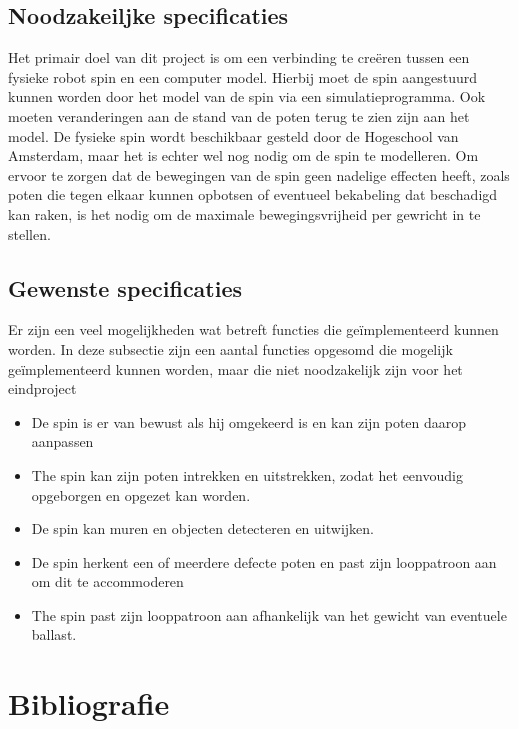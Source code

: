 \documentclass[10pt,a4paper]{article}
\begin{document}
\subsection{Noodzakeiljke specificaties}
Het primair doel van dit project is om een verbinding te creëren tussen een fysieke robot spin en een computer model. Hierbij moet de spin aangestuurd kunnen worden door het model van de spin via een simulatieprogramma. Ook moeten veranderingen aan de stand van de poten terug te zien zijn aan het model. De fysieke spin wordt beschikbaar gesteld door de Hogeschool van Amsterdam, maar het is echter wel nog nodig om de spin te modelleren.
Om ervoor te zorgen dat de bewegingen van de spin geen nadelige effecten heeft, zoals poten die tegen elkaar kunnen opbotsen of eventueel bekabeling dat beschadigd kan raken, is het nodig om de maximale bewegingsvrijheid per gewricht in te stellen.

\subsection{Gewenste specificaties}
Er zijn een veel mogelijkheden wat betreft functies die geïmplementeerd kunnen worden. In deze subsectie zijn een aantal functies opgesomd die mogelijk geïmplementeerd kunnen worden, maar die niet noodzakelijk zijn voor het eindproject

\begin{itemize}
\item De spin is er van bewust als hij omgekeerd is en kan zijn poten daarop aanpassen 
\item The spin kan zijn poten intrekken en uitstrekken, zodat het eenvoudig opgeborgen en opgezet kan worden.
\item De spin kan muren en objecten detecteren en uitwijken.
\item De spin herkent een of meerdere defecte poten en past zijn looppatroon aan om dit te accommoderen
\item The spin past zijn looppatroon aan afhankelijk van het gewicht van eventuele ballast.
\end{itemize}


\section{Bibliografie}


\end{document}

